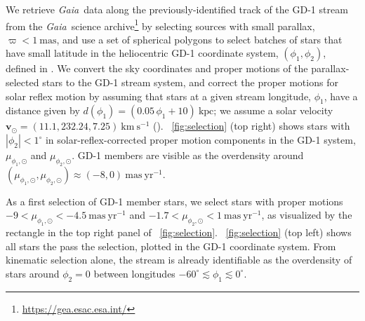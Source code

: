 \documentclass[modern]{aastex62}
\newcommand{\gaia}{\textsl{Gaia}}
\newcommand{\kms}{\ensuremath{\textrm{km}~\textrm{s}^{-1}}}
\newcommand{\bs}[1]{\boldsymbol{#1}}
\newcommand{\masyr}{\ensuremath{\textrm{mas}~\textrm{yr}^{-1}}}
\begin{document}
We retrieve \gaia\ data along the previously-identified track of the GD-1 stream
from the \gaia\ science archive\footnote{\url{https://gea.esac.esa.int/}} by
selecting sources with small parallax, $\varpi < 1~\textrm{mas}$, and use a
set of spherical polygons to select batches of stars that have small latitude in
the heliocentric GD-1 coordinate system, $(\phi_1, \phi_2)$, defined in
\cite{Koposov:2010}.
We convert the sky coordinates and proper motions of the parallax-selected stars
to the GD-1 stream system, and correct the proper motions for solar reflex
motion by assuming that stars at a given stream longitude, $\phi_1$, have a
distance given by $d(\phi_1) = (0.05 \, \phi_1 + 10)~\textrm{kpc}$;
we assume a solar velocity $\bs{v}_\odot = (11.1, 232.24, 7.25)~\kms$
(\citealt{Schonrich:2010, Bovy:2015}).
\figurename~\ref{fig:selection} (top right) shows stars with $|\phi_2| <
1^\circ$ in solar-reflex-corrected proper motion components in the GD-1 system,
$\mu_{\phi_1, \odot}$ and $\mu_{\phi_2, \odot}$.
GD-1 members are visible as the overdensity around $(\mu_{\phi_1, \odot},
\mu_{\phi_2, \odot}) \approx (-8, 0)~\masyr$.

As a first selection of GD-1 member stars, we select stars with proper motions
$-9 < \mu_{\phi_1, \odot} < -4.5~\masyr$ and $-1.7 < \mu_{\phi_2, \odot} <
1~\masyr$, as visualized by the rectangle in the top right panel of
\figurename~\ref{fig:selection}.
\figurename~\ref{fig:selection} (top left) shows all stars the pass the
selection, plotted in the GD-1 coordinate system.
From kinematic selection alone, the stream is already identifiable as the
overdensity of stars around $\phi_2 = 0$ between longitudes $-60^\circ \lesssim
\phi_1 \lesssim 0^\circ$.
\end{document}
